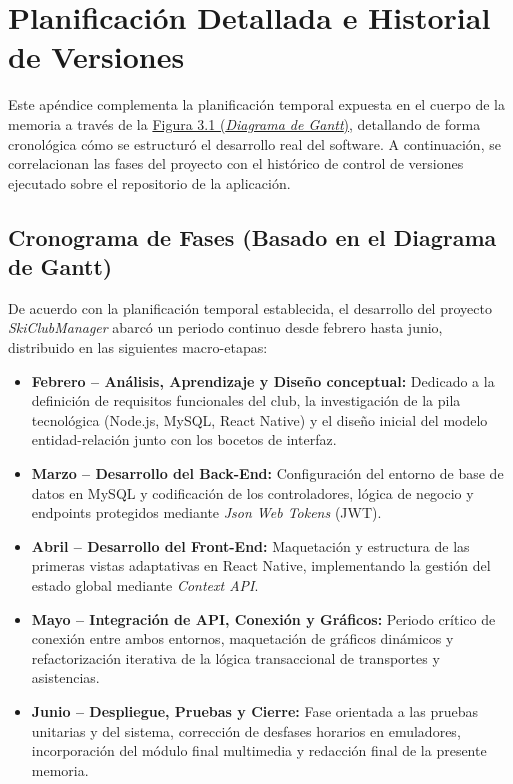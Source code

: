 \appendix
\chapter{Planificación Detallada e Historial de Versiones}
\label{ap:planificacion_versiones}

Este apéndice complementa la planificación temporal expuesta en el cuerpo de la memoria a través de la \hyperref[fig:gantt_diagram_detailed]{Figura 3.1 (\textit{Diagrama de Gantt})}, detallando de forma cronológica cómo se estructuró el desarrollo real del software. A continuación, se correlacionan las fases del proyecto con el histórico de control de versiones ejecutado sobre el repositorio de la aplicación.
    \section{Cronograma de Fases (Basado en el Diagrama de Gantt)}
    De acuerdo con la planificación temporal establecida, el desarrollo del proyecto \textit{SkiClubManager} abarcó un periodo continuo desde febrero hasta junio, distribuido en las siguientes macro-etapas:

    \begin{itemize}
        \item \textbf{Febrero -- Análisis, Aprendizaje y Diseño conceptual:} Dedicado a la definición de requisitos funcionales del club, la investigación de la pila tecnológica (Node.js, MySQL, React Native) y el diseño inicial del modelo entidad-relación junto con los bocetos de interfaz.
        \item \textbf{Marzo -- Desarrollo del Back-End:} Configuración del entorno de base de datos en MySQL y codificación de los controladores, lógica de negocio y endpoints protegidos mediante \textit{Json Web Tokens} (JWT).
        \item \textbf{Abril -- Desarrollo del Front-End:} Maquetación y estructura de las primeras vistas adaptativas en React Native, implementando la gestión del estado global mediante \textit{Context API}.
        \item \textbf{Mayo -- Integración de API, Conexión y Gráficos:} Periodo crítico de conexión entre ambos entornos, maquetación de gráficos dinámicos y refactorización iterativa de la lógica transaccional de transportes y asistencias.
        \item \textbf{Junio -- Despliegue, Pruebas y Cierre:} Fase orientada a las pruebas unitarias y del sistema, corrección de desfases horarios en emuladores, incorporación del módulo final multimedia y redacción final de la presente memoria.
    \end{itemize}

